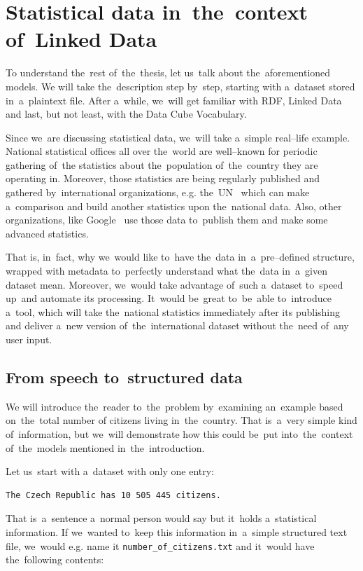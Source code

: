 \chapter{Statistical data in~the~context of~Linked Data}
\label{ch:statistical-data}
To understand the~rest of~the~thesis, let us~talk about the~aforementioned models.
We will take the~description step by~step, starting with a~dataset stored in~a~plaintext file.
After a~while, we~will get familiar with RDF, Linked Data and last, but not least, with the
Data Cube Vocabulary.

Since we~are discussing statistical data, we~will take a~simple real--life example.
National statistical offices all over the~world are well--known for periodic gathering of~the
statistics about the~population of~the~country they are operating in. Moreover, 
those statistics are being regularly published and gathered by~international 
organizations, e.g. the~UN~\cite{un} which can make a~comparison and build 
another statistics upon the~national data. Also, other organizations, like 
Google~\cite{pubdata} use those data to~publish them and make 
some advanced statistics.

That is, in~fact, why we~would like to~have the~data in~a~pre--defined structure,
wrapped with metadata to~perfectly understand what the~data in~a~given 
dataset mean. Moreover, we~would take advantage of~such a~dataset to~speed up~and automate its processing. It~would be~great to~be~able to~introduce a~tool, 
which will take the~national statistics immediately after its publishing and 
deliver a~new version of~the~international dataset without the~need of~any user 
input.

\section{From speech to~structured data}

We will introduce the~reader to~the~problem by~examining an~example based on~the~total number of
citizens living in~the~country. That is~a~very simple kind of~information, but we~will demonstrate
how this could be~put into~the~context of~the~models mentioned in~the~introduction.

Let us~start with a~dataset with only one entry:

\begin{verbatim}
The Czech Republic has 10 505 445 citizens.
\end{verbatim}

That is~a~sentence a~normal person would say but it~holds a~statistical information.
If we~wanted to~keep this information in~a~simple structured text file, we~would e.g. name it
\texttt{number\_of\_citizens.txt} and it~would have the~following contents:

